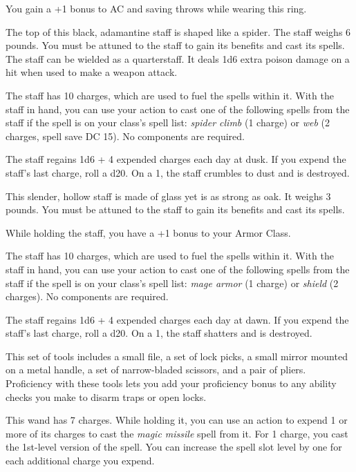 \documentclass[10pt,a4paper,twoside,bg=print,twocolumn,openany,nodeprecatedcode]{dndbook}
\begin{document}
You gain a +1 bonus to AC and saving throws while wearing this ring.

The top of this black, adamantine staff is shaped like a spider. The staff weighs 6 pounds. You must be attuned to the staff to gain its benefits and cast its spells. The staff can be wielded as a quarterstaff. It deals 1d6 extra poison damage on a hit when used to make a weapon attack.

The staff has 10 charges, which are used to fuel the spells within it. With the staff in hand, you can use your action to cast one of the following spells from the staff if the spell is on your class's spell list: \textit{spider climb} (1 charge) or \textit{web} (2 charges, spell save DC 15). No components are required.

The staff regains 1d6 + 4 expended charges each day at dusk. If you expend the staff's last charge, roll a d20. On a 1, the staff crumbles to dust and is destroyed.

This slender, hollow staff is made of glass yet is as strong as oak. It weighs 3 pounds. You must be attuned to the staff to gain its benefits and cast its spells.

While holding the staff, you have a +1 bonus to your Armor Class.

The staff has 10 charges, which are used to fuel the spells within it. With the staff in hand, you can use your action to cast one of the following spells from the staff if the spell is on your class's spell list: \textit{mage armor} (1 charge) or \textit{shield} (2 charges). No components are required.

The staff regains 1d6 + 4 expended charges each day at dawn. If you expend the staff's last charge, roll a d20. On a 1, the staff shatters and is destroyed.

This set of tools includes a small file, a set of lock picks, a small mirror mounted on a metal handle, a set of narrow-bladed scissors, and a pair of pliers. Proficiency with these tools lets you add your proficiency bonus to any ability checks you make to disarm traps or open locks.

This wand has 7 charges. While holding it, you can use an action to expend 1 or more of its charges to cast the \textit{magic missile} spell from it. For 1 charge, you cast the 1st-level version of the spell. You can increase the spell slot level by one for each additional charge you expend.
\end{document}
